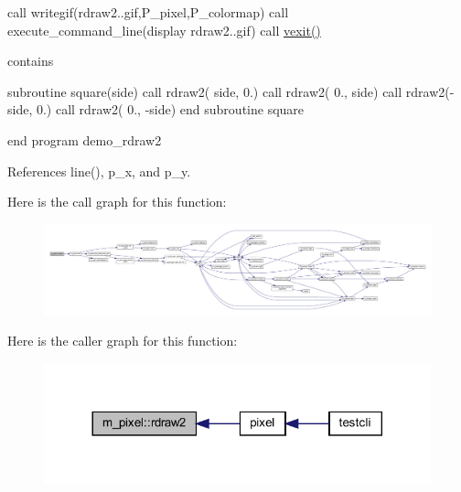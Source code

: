 call writegif(\textquotesingle{}rdraw2..\+gif\textquotesingle{},P\+\_\+pixel,P\+\_\+colormap) call execute\+\_\+command\+\_\+line(\textquotesingle{}display rdraw2..\+gif\textquotesingle{}) call \hyperlink{namespacem__pixel_a19ad6b65752322b0029a62cc0ebec3e8}{vexit()}

contains

subroutine square(side) call rdraw2( side, 0.) call rdraw2( 0., side) call rdraw2(-\/side, 0.) call rdraw2( 0., -\/side) end subroutine square

end program demo\+\_\+rdraw2 

References line(), p\+\_\+x, and p\+\_\+y.

Here is the call graph for this function\+:
\nopagebreak
\begin{figure}[H]
\begin{center}
\leavevmode
\includegraphics[width=350pt]{namespacem__pixel_a664375b036092dbebe1bccdc67254e1d_cgraph}
\end{center}
\end{figure}
Here is the caller graph for this function\+:
\nopagebreak
\begin{figure}[H]
\begin{center}
\leavevmode
\includegraphics[width=317pt]{namespacem__pixel_a664375b036092dbebe1bccdc67254e1d_icgraph}
\end{center}
\end{figure}
\mbox{\label{namespacem__pixel_a5435aa0d9d6048a62c09d7d90665b958}} 
